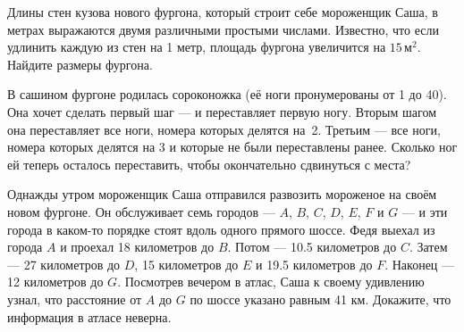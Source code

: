 ﻿
\begin{enumerate}
\itA Длины стен кузова нового фургона, который строит себе мороженщик Саша, в метрах выражаются двумя различными простыми числами. Известно, что если удлинить каждую из стен на 1 метр, площадь фургона увеличится на $15\,\text{м}^2$. Найдите размеры фургона.

\itB В сашином фургоне родилась сороконожка (её ноги пронумерованы от 1 до 40). Она хочет сделать первый шаг — и переставляет первую ногу. Вторым шагом она переставляет все ноги, номера которых делятся на~2. Третьим — все ноги, номера которых делятся на 3 и которые не были переставлены ранее. Сколько ног ей теперь осталось переставить, чтобы окончательно сдвинуться с места?

\itC Однажды утром мороженщик Саша отправился развозить мороженое на своём новом фургоне. Он обслуживает семь городов — $A$, $B$, $C$, $D$, $E$, $F$ и $G$ — и эти города в каком-то порядке стоят вдоль одного прямого шоссе. Федя выехал из города $A$ и проехал 18 километров до $B$. Потом — 10.5 километров до $C$. Затем — 27 километров до $D$, 15 километров до $E$ и 19.5 километров до $F$. Наконец — 12 километров до $G$. Посмотрев вечером в атлас, Саша к своему удивлению узнал, что расстояние от $A$ до $G$ по шоссе указано равным 41 км. Докажите, что информация в атласе неверна.
\end{enumerate}